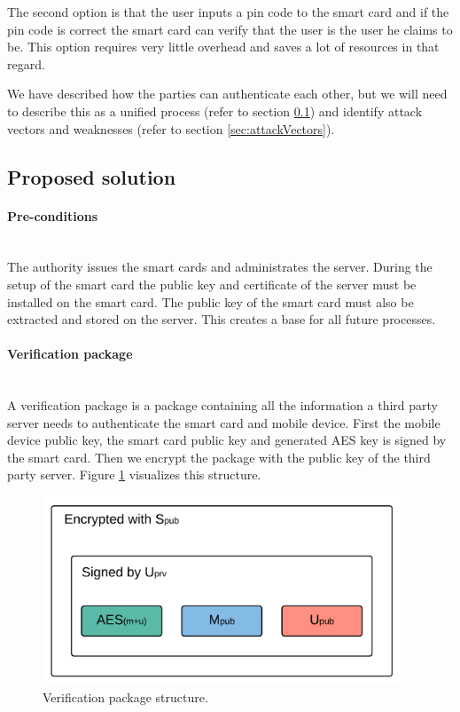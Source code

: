 The second option is that the user inputs a pin code to the smart card and if the pin code is correct the smart card can verify that the user is the user he claims to be. This option requires very little overhead and saves a lot of resources in that regard.

We have described how the parties can authenticate each other, but we will need to describe this as a unified process (refer to section \ref{sec:proposedSolution}) and identify attack vectors and weaknesses (refer to section \ref{sec:attackVectors}).

\subsection{Proposed solution}
\label{sec:proposedSolution}

\paragraph{Pre-conditions}\mbox{}\\
The authority issues the smart cards and administrates the server. During the setup of the smart card the public key and certificate of the server must be installed on the smart card. The public key of the smart card must also be extracted and stored on the server. This creates a base for all future processes.

\paragraph{Verification package}\mbox{}\\
A verification package is a package containing all the information a third party server needs to authenticate the smart card and mobile device. First the mobile device public key, the smart card public key and generated AES key is signed by the smart card. Then we encrypt the package with the public key of the third party server. Figure \ref{fig:h0} visualizes this structure.

\newpage

\begin{figure}[h!]
  \caption{Verification package structure.}
  \label{fig:h0}
  \centering
    \includegraphics[width=0.95\textwidth]{images/H0.png}
\end{figure}

